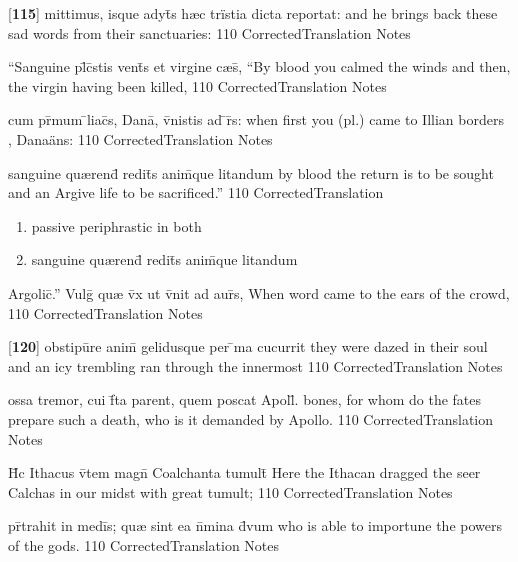 \latline
  {[\textbf{115}] mittimus, isque adyt\={\macron {\i}}s h{\ae}c tr\"{i}stia dicta reportat:}
  { and he brings back these sad words from their sanctuaries:  }
  {110}
  { CorrectedTranslation }
  { Notes }


\latline
  {``Sanguine pl\={}c\={}stis vent\={}s et virgine c{\ae}s\={},}
  { ``By blood you calmed the winds and then, the virgin having been killed, }
  {110}
  { CorrectedTranslation }
  { Notes }


\latline
  {cum pr\={\macron {\i}}mum \={}liac\={}s, Dana\={\macron {\i}}, v\={}nistis ad \={}r\={}s:}
  { when first you (pl.) came to Illian borders , Dana\"ans: }
  {110}
  { CorrectedTranslation }
  { Notes }


\latline
  {sanguine qu{\ae}rend\={\macron {\i}} redit\={}s anim\={}que litandum}
  { by blood the return is to be sought and an Argive life to be sacrificed.''  }
  {110}
  { CorrectedTranslation }
  { \begin{enumerate}
  	\item passive periphrastic in both
  	\item sanguine qu{\ae}rend\={\macron {\i}} redit\={}s anim\={}que litandum
  \end{enumerate} }


\latline
  {Argolic\={}.''  Vulg\={\macron {\i}} qu{\ae} v\={}x ut v\={}nit ad aur\={\macron {\i}}s,}
  { When word came to the ears of the crowd, }
  {110}
  { CorrectedTranslation }
  { Notes }


\latline
  {[\textbf{120}] obstipu\={}re anim\={\macron {\i}} gelidusque per \={\macron {\i}}ma cucurrit}
  { they were dazed in their soul and an icy trembling ran through the innermost }
  {110}
  { CorrectedTranslation }
  { Notes }


\latline
  {ossa tremor, cui f\={}ta parent, quem poscat Apoll\={}.}
  { bones, for whom do the fates prepare such a death, who is it demanded by Apollo. }
  {110}
  { CorrectedTranslation }
  { Notes }


\latline
  {H\={\macron {\i}}c Ithacus v\={}tem magn\={} Coalchanta tumult\={}}
  { Here the Ithacan dragged the seer Calchas in our midst with great tumult;  }
  {110}
  { CorrectedTranslation }
  { Notes }


\latline
  {pr\={}trahit in medi\={}s; qu{\ae} sint ea n\={}mina d\={\macron {\i}}vum}
  { who is able to importune the powers of the gods. }
  {110}
  { CorrectedTranslation }
  { Notes }


